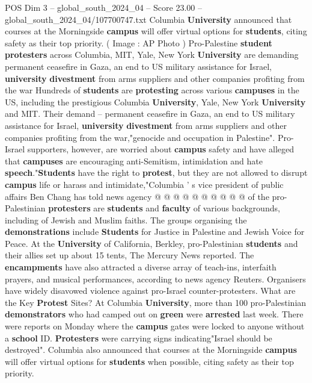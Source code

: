 \begin{textsample}{POS Dim 3 – global\_south\_2024\_04 – Score 23.00 – global\_south\_2024\_04/107700747.txt}  \label{ex:f3_pos_190}
Columbia \textbf{University} announced that courses at the Morningside \textbf{campus} will offer virtual options for \textbf{students}, citing safety as their top priority. ( Image : AP Photo ) Pro-Palestine \textbf{student} \textbf{protesters} across Columbia, MIT, Yale, New York \textbf{University} are demanding permanent ceasefire in Gaza, an end to US military assistance for Israel, \textbf{university} \textbf{divestment} from arms suppliers and other companies profiting from the war Hundreds of \textbf{students} are \textbf{protesting} across various \textbf{campuses} in the US, including the prestigious Columbia \textbf{University}, Yale, New York \textbf{University} and MIT.
Their demand -- permanent ceasefire in Gaza, an end to US military assistance for Israel, \textbf{university} \textbf{divestment} from arms suppliers and other companies profiting from the war,"genocide and occupation in Palestine".
Pro-Israel supporters, however, are worried about \textbf{campus} safety and have alleged that \textbf{campuses} are encouraging anti-Semitism, intimidation and hate \textbf{speech}."\textbf{Students} have the right to \textbf{protest}, but they are not allowed to disrupt \textbf{campus} life or harass and intimidate,"Columbia ' s vice president of public affairs Ben Chang has told news agency @ @ @ @ @ @ @ @ @ @ of the pro-Palestinian \textbf{protesters} are \textbf{students} and \textbf{faculty} of various backgrounds, including of Jewish and Muslim faiths.
The groups organising the \textbf{demonstrations} include \textbf{Students} for Justice in Palestine and Jewish Voice for Peace.
At the \textbf{University} of California, Berkley, pro-Palestinian \textbf{students} and their allies set up about 15 tents, The Mercury News reported.
The \textbf{encampments} have also attracted a diverse array of teach-ins, interfaith prayers, and musical performances, according to news agency Reuters.
Organisers have widely disavowed violence against pro-Israel counter-protesters.
What are the Key \textbf{Protest} Sites?
At Columbia \textbf{University}, more than 100 pro-Palestinian \textbf{demonstrators} who had camped out on \textbf{green} were \textbf{arrested} last week.
There were reports on Monday where the \textbf{campus} gates were locked to anyone without a \textbf{school} ID. \textbf{Protesters} were carrying signs indicating"Israel should be destroyed".
Columbia also announced that courses at the Morningside \textbf{campus} will offer virtual options for \textbf{students} when possible, citing safety as their top priority.

\end{textsample}
